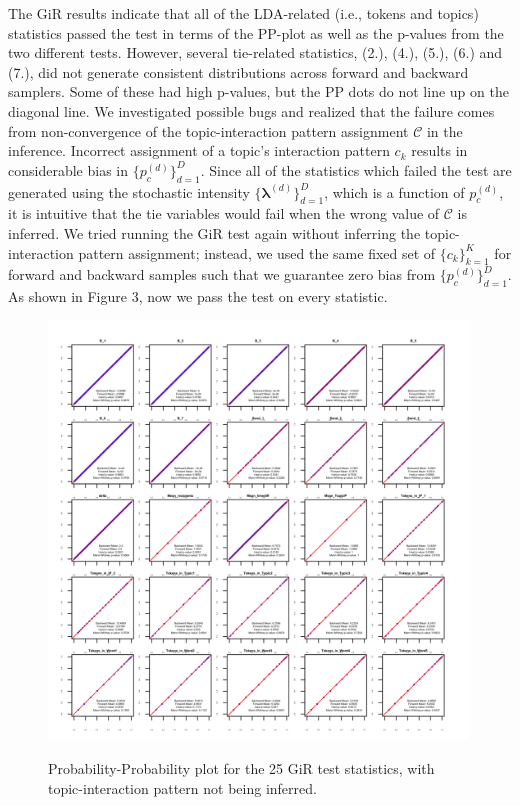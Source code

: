\documentclass[a4paper]{article}
\begin{document}
The GiR  results indicate that all of the LDA-related (i.e., tokens and topics) statistics passed the test in terms of the PP-plot as well as the p-values from the two different tests. However, several tie-related statistics, (2.), (4.), (5.), (6.) and (7.), did not generate consistent distributions across forward and backward samplers. Some of these had high p-values, but the PP dots do not line up on the diagonal line. We investigated possible bugs and realized that the failure comes from non-convergence of the topic-interaction pattern assignment $\mathcal{C}$ in the inference. Incorrect assignment of a topic's interaction pattern $c_k$ results in considerable bias in $\{p_c^{(d)}\}_{d=1}^D$. Since all of the statistics which failed the test are generated using the stochastic intensity $\{\boldsymbol{\lambda}^{(d)}\}_{d=1}^D$, which is a function of $p_c^{(d)}$, it is intuitive that the tie variables would fail when the wrong value of $\mathcal{C}$ is inferred. We tried running the GiR test again without inferring the topic-interaction pattern assignment; instead, we used the same fixed set of $\{c_k\}_{k=1}^K$ for forward and backward samples such that we guarantee zero bias from $\{p_c^{(d)}\}_{d=1}^D$. As shown in Figure 3, now we pass the test on every statistic.
\begin{figure}[ht]
	\centering
	\includegraphics[width=0.99\textwidth]{plots/Schein_noC_50K-1.png} 
	\label{fig:PPplot_noC}
\caption{Probability-Probability plot for the 25 GiR test statistics, with topic-interaction pattern not being inferred.}
\end{figure}
\end{document}
